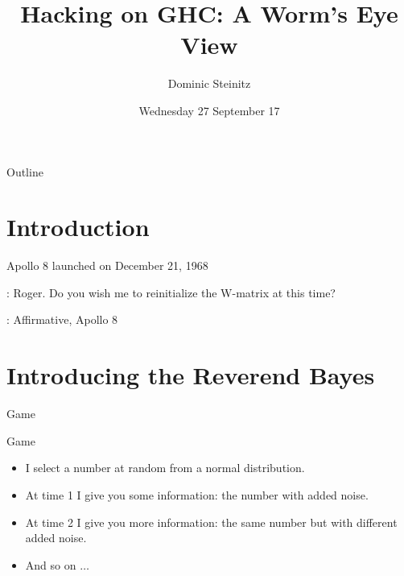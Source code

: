\documentclass[presentation]{beamer}
\author{Dominic Steinitz}
\date{Wednesday 27 September 17}
\title{Hacking on GHC: A Worm's Eye View}
\begin{document}
\maketitle
\begin{frame}{Outline}
\tableofcontents
\end{frame}

\section{Introduction}

\begin{frame}{Apollo 8 launched on December 21, 1968}


\begin{drama}

  \jimspeaks: Roger. Do you wish me to reinitialize the W-matrix at this time?
\end{drama}


\begin{drama}

  \kenspeaks: Affirmative, Apollo 8
\end{drama}

\section{Introducing the Reverend Bayes}
\end{frame}

\begin{frame}{Game}

  \begin{block}{Game}
    \begin{itemize}
    \item I select a number at random from a normal distribution.
    \item At time 1 I give you some information: the number with added noise.
    \item At time 2 I give you more information: the same number but with different added noise.
    \item And so on $\ldots$
    \end{itemize}
  \end{block}

\end{frame}
\end{document}
